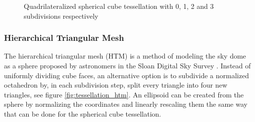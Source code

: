 \begin{figure}
\begin{subfigure}[b]{0.2\textwidth}
    \end{subfigure}
    \caption{Quadrilateralized spherical cube tessellation with 0, 1, 2 and 3 subdivisions respectively}
    \label{fig:tessellation_cube}
\end{figure}

\subsubsection{Hierarchical Triangular Mesh}

The hierarchical triangular mesh (HTM) is a method of modeling the sky dome as a sphere proposed by astronomers in the Sloan Digital Sky Survey \cite{htm}. Instead of uniformly dividing cube faces, an alternative option is to subdivide a normalized octahedron by, in each subdivision step, split every triangle into four new triangles, see figure \ref{fig:tessellation_htm}. An ellipsoid can be created from the sphere by normalizing the coordinates and linearly rescaling them the same way that can be done for the spherical cube tessellation.

